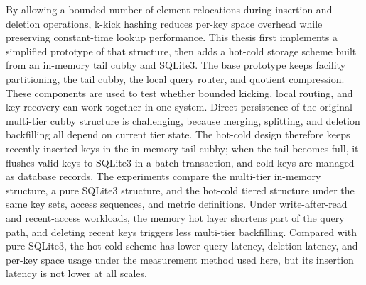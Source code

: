\documentclass[
    type = bachelor,
    decl-page,  %
    twoside,                %
  ]{njuthesis}
\begin{document}
\begin{abstract*}

By allowing a bounded number of element relocations during insertion and deletion operations, k-kick hashing reduces per-key space overhead while preserving constant-time lookup performance. This thesis first implements a simplified prototype of that structure, then adds a hot-cold storage scheme built from an in-memory tail cubby and SQLite3. The base prototype keeps facility partitioning, the tail cubby, the local query router, and quotient compression. These components are used to test whether bounded kicking, local routing, and key recovery can work together in one system. Direct persistence of the original multi-tier cubby structure is challenging, because merging, splitting, and deletion backfilling all depend on current tier state. The hot-cold design therefore keeps recently inserted keys in the in-memory tail cubby; when the tail becomes full, it flushes valid keys to SQLite3 in a batch transaction, and cold keys are managed as database records. The experiments compare the multi-tier in-memory structure, a pure SQLite3 structure, and the hot-cold tiered structure under the same key sets, access sequences, and metric definitions. Under write-after-read and recent-access workloads, the memory hot layer shortens part of the query path, and deleting recent keys triggers less multi-tier backfilling. Compared with pure SQLite3, the hot-cold scheme has lower query latency, deletion latency, and per-key space usage under the measurement method used here, but its insertion latency is not lower at all scales.

\end{abstract*}

\tableofcontents

\mainmatter








\end{document}
